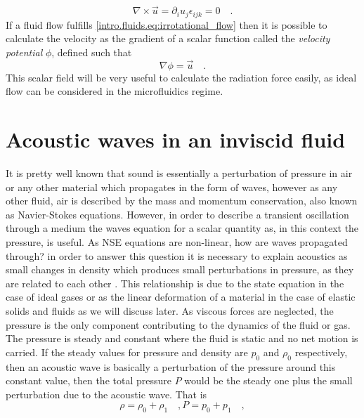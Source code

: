 \begin{equation}\label{intro.fluids.eq:irrotational_flow}
    \nabla\times\vec u = \partial_i u_j \epsilon_{ijk} = 0\quad.
\end{equation}
If a fluid flow fulfills \ref{intro.fluids.eq:irrotational_flow} then it is possible to calculate the velocity as the gradient of a scalar function called the \textit{velocity potential} $\phi$, defined such that
\begin{equation}\label{intro.fluids.eq:velocity_potential}
    \nabla\phi = \vec u\quad.
\end{equation}
This scalar field will be very useful to calculate the radiation force easily, as ideal flow can be considered in the microfluidics regime. 
\section{Acoustic waves in an inviscid fluid}\label{intro.sec:acoustics}
It is pretty well known that sound is essentially a perturbation of pressure in air or any other material which propagates in the form of waves, however as any other fluid, air is described by the mass and momentum conservation, also known as Navier-Stokes equations. However, in order to describe a transient oscillation through a medium the waves equation for a scalar quantity as, in this context the pressure, is useful. As NSE equations are non-linear, how are waves propagated through? in order to answer this question it is necessary to explain acoustics as small changes in density which produces small perturbations in pressure, as they are related to each other . This relationship is due to the state equation in the case of ideal gases or as the linear deformation of a material in the case of elastic solids and fluids as we will discuss later. As viscous forces are neglected, the pressure is the only component contributing to the dynamics of the fluid or gas. The pressure is steady and constant where the fluid is static and no net motion is carried. If the steady values for pressure and density are $p_0$ and $\rho_0$ respectively, then an acoustic wave is basically a perturbation of the pressure around this constant value, then the total pressure $P$ would be the steady one plus the small perturbation due to the acoustic wave. That is
\begin{subequations}\label{intro.acoustics.eq:expand}
\begin{equation}\label{intro.acoustics.eq:expand_rho}
    \rho = \rho_0 + \rho_1\quad,
\end{equation}  
\begin{equation}\label{intro.acoustics.eq:expand_p}
    P = p_0 + p_1\quad,
\end{equation}  
\end{subequations}
